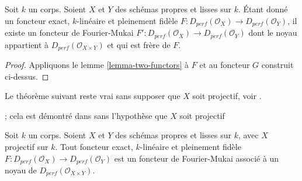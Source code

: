 \begin{lemma}
\label{lemma-fully-faithful}
Soit $k$ un corps. Soient $X$ et $Y$ des schémas propres et lisses sur $k$.
Étant donné un foncteur exact, $k$-linéaire et pleinement fidèle
$F : D_{perf}(\mathcal{O}_X) \to D_{perf}(\mathcal{O}_Y)$,
il existe un foncteur de Fourier-Mukai
$F' : D_{perf}(\mathcal{O}_X) \to D_{perf}(\mathcal{O}_Y)$ dont le noyau
appartient à $D_{perf}(\mathcal{O}_{X \times Y})$ et qui est frère de $F$.
\end{lemma}

\begin{proof}
Appliquons le lemme \ref{lemma-two-functors} à $F$ et au foncteur
$G$ construit ci-dessus.
\end{proof}

\noindent
Le théorème suivant reste vrai sans supposer que $X$ soit projectif,
voir \cite{Noah}.

\begin{theorem}[Orlov]
\label{theorem-fully-faithful}
\begin{reference}
\cite[Theorem 2.2]{Orlov-K3} ; cela est démontré dans \cite{Noah}
sans l'hypothèse que $X$ soit projectif
\end{reference}
Soit $k$ un corps. Soient $X$ et $Y$ des schémas propres et lisses sur $k$,
avec $X$ projectif sur $k$. Tout foncteur exact, $k$-linéaire et pleinement fidèle
$F : D_{perf}(\mathcal{O}_X) \to D_{perf}(\mathcal{O}_Y)$
est un foncteur de Fourier-Mukai associé à un noyau de
$D_{perf}(\mathcal{O}_{X \times Y})$.
\end{theorem}

